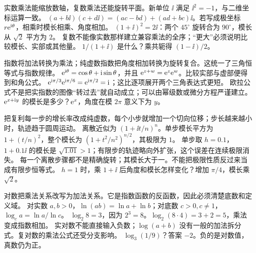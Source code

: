 \idea 实数乘法能缩放数轴，复数乘法还能旋转平面。新单位 $\ii$ 满足 $\ii^2=-1$，与二维坐标运算一致。
\mathpart $(a+b\ii)(c+d\ii)=(ac-bd)+(ad+bc)\ii$。若写成极坐标 $r\mathrm e^{\mathrm i\theta}$，相乘时模长相乘、角度相加。
\examplepart $(1+\ii)^2=2\ii$：两个 $45^\circ$ 旋转合为 $90^\circ$，模长从 $\sqrt2$ 平方为 $2$。
\pitfall 复数不能像实数那样建立兼容乘法的全序；“更大”必须说明比较模长、实部或其他量。
\exercise $1/(1+\ii)$ 是什么？乘共轭得 $(1-\ii)/2$。
\nextlesson

\idea 指数将加法转换为乘法；纯虚数指数把角度相加转换为旋转复合。这统一了三角恒等式与指数规律。
\mathpart $\mathrm e^{\mathrm i\theta}=\cos\theta+\mathrm i\sin\theta$，并且 $\mathrm e^{z+w}=\mathrm e^z\mathrm e^w$。比较实部与虚部便得到和角公式。
\examplepart $\mathrm e^{\mathrm i\pi/3}\mathrm e^{\mathrm i\pi/6}=\mathrm e^{\mathrm i\pi/2}=\mathrm i$；这比逐项展开两个三角表达式更短。
\pitfall 欧拉公式不是把实指数的图像“转过去”就自动成立；可以由幂级数或微分方程严谨建立。
\exercise $\mathrm e^{x+\mathrm i y}$ 的模长是多少？$\mathrm e^x$，角度在模 $2\pi$ 意义下为 $y$。
\nextlesson

\idea 把复利每一步的增长率改成纯虚数，每个小步就增加一个切向位移；步长越来越小时，轨迹趋于圆周运动。
\mathpart 离散近似为 $(1+\ii t/n)^n$。单步模长平方为 $1+(t/n)^2$，整个模长为 $(1+t^2/n^2)^{n/2}$，其极限为 $1$。
\examplepart 单步取 $h=0.1$，$1+0.1\ii$ 的模长是 $\sqrt{1.01}>1$；有限步的轨迹略向外扩张，这个误差在连续极限消失。
\pitfall 每一个离散步骤都不是精确旋转；其模长大于一。不能把极限性质反过来当成有限步恒等式。
\exercise $h=1$ 时，乘 $1+\ii$ 后角度和模长怎样变化？增加 $\pi/4$，模长乘 $\sqrt2$。
\nextlesson

\idea 对数把乘法关系改写为加法关系。它是指数函数的反函数，因此必须清楚底数和定义域。
\mathpart 对实数 $a,b>0$，$\ln(ab)=\ln a+\ln b$；对底数 $c>0,c\ne1$，$\log_c a=\ln a/\ln c$。
\examplepart $\log_2 8=3$，因为 $2^3=8$。$\log_2(8\cdot4)=3+2=5$，乘法变成指数相加。
\pitfall 实对数不能直接输入负数；$\log(a+b)$ 没有一般的加法拆分式。复对数的乘法公式还受分支影响。
\exercise $\log_3(1/9)$？答案 $-2$。负的是对数值，真数仍为正。
\nextlesson


